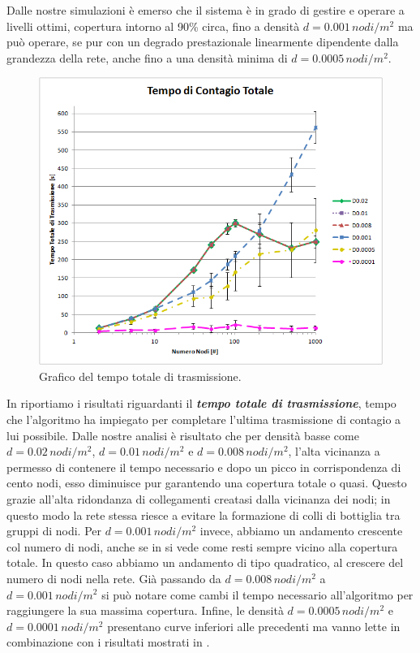 Dalle nostre simulazioni è emerso che il sistema è in grado di gestire e operare a livelli ottimi, copertura intorno al 90\% circa, fino a densità $d=0.001\, nodi/m^2$ ma può operare, se pur con un degrado prestazionale linearmente dipendente dalla grandezza della rete, anche fino a una densità minima di $d=0.0005\, nodi/m^2$.
\begin{figure}[t]
	\centering
	\includegraphics[width=0.9\linewidth]{Images/risultati/tempo_totale}
	\caption[Tempo totale di trasmissione]{Grafico del tempo totale di trasmissione.}
	\label{fig:tempo_totale}
\end{figure}
In  riportiamo i risultati riguardanti il \textbf{\textit{tempo totale di trasmissione}}, tempo che l'algoritmo ha impiegato per completare l'ultima trasmissione di contagio a lui possibile. Dalle nostre analisi è risultato che per densità basse come $d=0.02\, nodi/m^2$, $d=0.01\, nodi/m^2$ e $d=0.008\, nodi/m^2$, l'alta vicinanza a permesso di contenere il tempo necessario e dopo un picco in corrispondenza di cento nodi, esso diminuisce pur garantendo una copertura totale o quasi. Questo grazie all'alta ridondanza di collegamenti creatasi dalla vicinanza dei nodi; in questo modo la rete stessa riesce a evitare la formazione di colli di bottiglia tra gruppi di nodi. Per $d=0.001\, nodi/m^2$ invece, abbiamo un andamento crescente col numero di nodi, anche se in  si vede come resti sempre vicino alla copertura totale.  In questo caso abbiamo un andamento di tipo quadratico, al crescere del numero di nodi nella rete. Già passando da $d=0.008\, nodi/m^2$ a $d=0.001\, nodi/m^2$ si può notare come cambi il tempo necessario all'algoritmo per raggiungere la sua massima copertura. Infine, le densità $ d=0.0005\, nodi/m^2 $ e $ d=0.0001\, nodi/m^2 $ presentano curve inferiori alle precedenti ma vanno lette in combinazione con i risultati mostrati in . 
